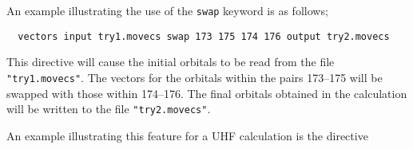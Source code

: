 %
%
% 
% 
% 
%
% 

An example illustrating the use of the \verb+swap+ keyword is as follows;
\begin{verbatim}
  vectors input try1.movecs swap 173 175 174 176 output try2.movecs
\end{verbatim}

This directive will cause the initial orbitals to be read 
from the file \verb+"try1.movecs"+.  The vectors for the orbitals
within the pairs 173--175 will be swapped with those within 174--176.
The final orbitals obtained in the calculation will be written to
the file \verb+"try2.movecs"+.

An example illustrating this feature for a UHF calculation is the directive

